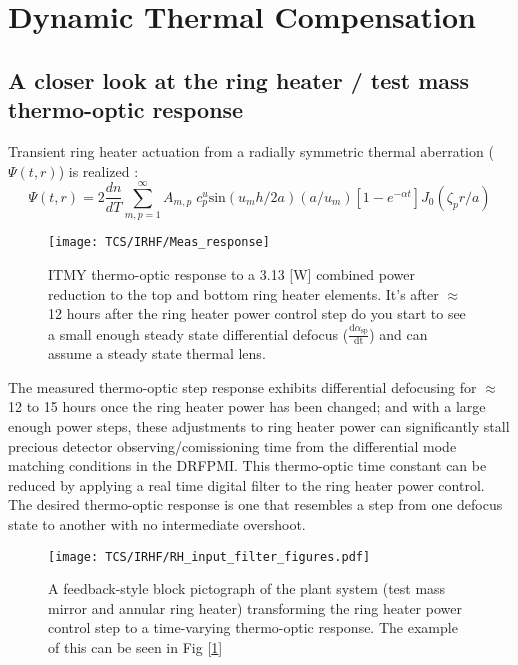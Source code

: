 \section{Dynamic Thermal Compensation}
\subsection{A closer look at the ring heater / test mass thermo-optic response}
Transient ring heater actuation from a radially symmetric thermal aberration ($\Psi(t,r)$) is realized \cite{Ramette:16}:
\begin{equation}
	\Psi(t,r)=2\frac{dn}{dT} \sum^{\infty}_{m,p = 1} A_{m,p} \; c^{u}_{p} \mathrm{sin}(u_m h /2a) (a/u_m)[1-e^{-\alpha t}] J_0(\zeta_p r/a)
\end{equation}

\begin{figure}[H]
 \texttt{[image: TCS/IRHF/Meas\_response]}
 \caption{ITMY thermo-optic response to a 3.13 [W] combined power reduction to the top and bottom ring heater elements. It's after $\approx$ 12 hours after the ring heater power control step do you start to see a small enough steady state differential defocus ($\frac{\mathrm{d} \alpha_\mathrm{sp}}{\mathrm{dt}}$) and can assume a steady state thermal lens.}
 \label{fig:RHresp}
\end{figure}

The measured thermo-optic step response exhibits differential defocusing for $\approx$ 12 to 15 hours once the ring heater power has been changed; and with a large enough power steps, these adjustments to ring heater power can significantly stall precious detector observing/comissioning time from the differential mode matching conditions in the DRFPMI. This thermo-optic time constant can be reduced by applying a real time digital filter to the ring heater power control. The desired thermo-optic response is one that resembles a step from one defocus state to another with no intermediate overshoot. 

\begin{figure}[H]
\centering
\texttt{[image: TCS/IRHF/RH\_input\_filter\_figures.pdf]}
\caption{A feedback-style block pictograph of the plant system (test mass mirror and annular ring heater) transforming the ring heater power control step to a time-varying thermo-optic response. The example of this can be seen in Fig [\ref{fig:RHresp}]}
\label{fig:justplant}
\end{figure}

